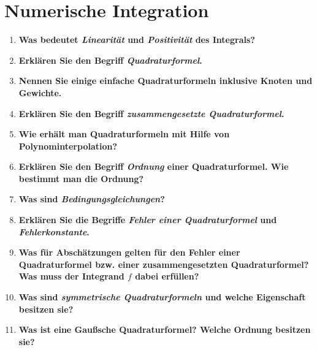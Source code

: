 \section{Numerische Integration}
	\begin{enumerate}
		\item \textbf{Was bedeutet \textit{Linearität} und \textit{Positivität} des Integrals?} \\
		
		\item \textbf{Erklären Sie den Begriff \textit{Quadraturformel}.} \\
		
		\item \textbf{Nennen Sie einige einfache Quadraturformeln inklusive Knoten und Gewichte.} \\
		
		\item \textbf{Erklären Sie den Begriff \textit{zusammengesetzte Quadraturformel}.} \\
		
		\item \textbf{Wie erhält man Quadraturformeln mit Hilfe von Polynominterpolation?} \\
		
		\item \textbf{Erklären Sie den Begriff \textit{Ordnung} einer Quadraturformel. Wie bestimmt man die Ordnung?} \\
		
		\item \textbf{Was sind \textit{Bedingungsgleichungen}?} \\
		
		\item \textbf{Erklären Sie die Begriffe \textit{Fehler einer Quadraturformel} und \textit{Fehlerkonstante}.} \\
		
		\item \textbf{Was für Abschätzungen gelten für den Fehler einer Quadraturformel bzw. einer zusammengesetzten Quadraturformel? Was muss der Integrand $f$ dabei erfüllen?} \\
		
		\item \textbf{Was sind \textit{symmetrische Quadraturformeln} und welche Eigenschaft besitzen sie?} \\
		
		\item \textbf{Was ist eine Gaußsche Quadraturformel? Welche Ordnung besitzen sie?} \\
		

\end{enumerate}
